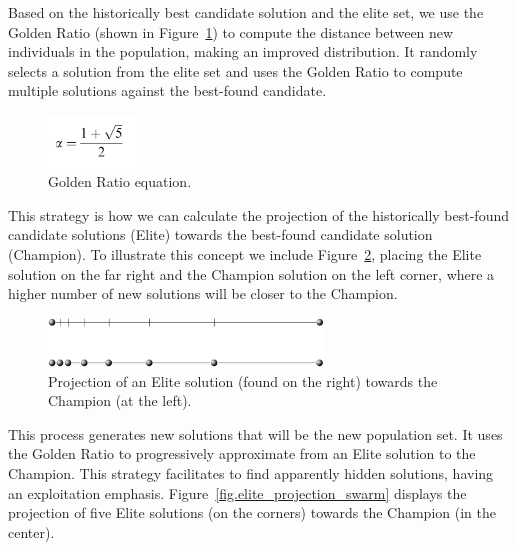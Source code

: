 \documentclass[graybox]{svmult}
\begin{document}
        Based on the historically best candidate
        solution and the elite set, we use the Golden Ratio (shown in
        Figure~\ref{fig.golden_ratio}) to compute the distance between new individuals
        in the population, making an improved distribution. It randomly selects a
        solution from the elite set and uses the Golden Ratio 
        \cite{nematollahi2020novel, gaikwad2021face, khesin2022golden, sym13081334, https://doi.org/10.1111/nyas.14895} 
        to compute multiple solutions against the best-found candidate.

        \begin{figure}
            \centering
            \includegraphics[width=25mm]{img/fig_golden_ratio.pdf}
            \caption{Golden Ratio equation.} \label{fig.golden_ratio}
            \end{figure}

        This strategy is how we can calculate the projection of the historically
        best-found candidate solutions (Elite) towards the best-found candidate
        solution (Champion). To illustrate this concept we include
        Figure~\ref{fig.elite_projection}, placing the Elite solution on the far right
        and the Champion solution on the left corner, where a higher number of new
        solutions will be closer to the Champion.

        \begin{figure}
            \centering
            \includegraphics[width=0.65\textwidth]{img/fig_elite_projection.pdf}
            \caption{Projection of an Elite solution (found on the right) towards the Champion (at the left).} \label{fig.elite_projection}
            \end{figure}

        This process generates new solutions that will be the new population set. It
        uses the Golden Ratio to progressively approximate from an Elite solution to
        the Champion. This strategy facilitates to find apparently hidden solutions,
        having an exploitation emphasis. Figure~\ref{fig.elite_projection_swarm}
        displays the projection of five Elite solutions (on the corners) towards the
        Champion (in the center).
\end{document}
